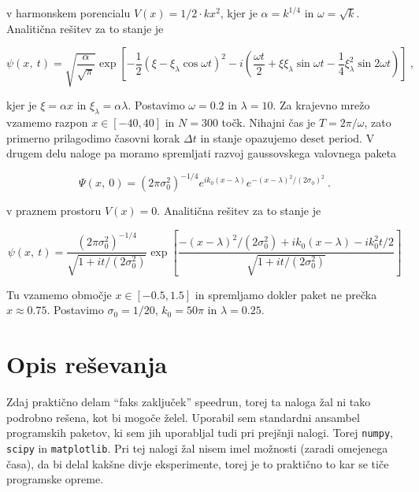 \documentclass[a4paper]{article}
\begin{document}
v harmonskem porencialu $V(x) = 1/2\cdot k x^2$, kjer je $\alpha = k^{1/4}$ in $\omega = \sqrt{k}$.
Analitična rešitev za to stanje je

\begin{equation}
    \psi(x,\>t) = \sqrt{\frac{\alpha}{\sqrt{\pi}}} \exp{\left[-\frac{1}{2}(\xi - 
    \xi_\lambda \cos{\omega t})^2-
    i\left(\frac{\omega t}{2} + \xi\xi_\lambda \sin{\omega t} - 
    \frac{1}{4}\xi_\lambda^2\sin{2\omega t}\right)\right]}\>,
    \label{analiticna_resitev1}
\end{equation}

kjer je $\xi=\alpha x$ in $\xi_\lambda = \alpha\lambda$. Postavimo $\omega=0.2$ in $\lambda=10$.
Za krajevno mrežo vzamemo razpon $x\in[-40, 40]$ in $N=300$ točk. Nihajni čas je $T=2\pi/\omega$,
zato primerno prilagodimo časovni korak $\Delta t$ in stanje opazujemo deset period. V drugem delu naloge pa moramo spremljati razvoj gaussovskega valovnega paketa 

\begin{equation}
    \Psi(x,\>0) = (2\pi\sigma_0^2)^{-1/4} e^{ik_0(x-\lambda)}e^{-(x-\lambda)^2/(2\sigma_0)^2}\>.
    \label{zacetno_stanje2}
\end{equation}

v praznem prostoru $V(x) = 0$. Analitična rešitev za to stanje je

\begin{equation}
    \psi(x,\>t) = \frac{(2\pi\sigma_0^2)^{-1/4}}{\sqrt{1 + i t/(2\sigma_0^2)}}
    \exp{\left[\frac{-(x-\lambda)^2/(2\sigma_0^2) + ik_0(x-\lambda)-ik_0^2 t/2}
    {\sqrt{1 + i t/(2\sigma_0^2)}}\right]}
    \label{analiticna_resitev2}
\end{equation}

Tu vzamemo območje $x\in[-0.5, 1.5]$ in spremljamo dokler paket ne prečka $x\approx 0.75$.
Postavimo $\sigma_0=1/20$, $k_0=50\pi$ in $\lambda=0.25$.

\section{Opis reševanja}
Zdaj praktično delam ``faks zaključek'' speedrun, torej ta naloga žal ni tako podrobno rešena,
kot bi mogoče želel. Uporabil sem standardni ansambel programskih paketov, ki sem jih uporabljal
tudi pri prejšnji nalogi. Torej \texttt{numpy}, \texttt{scipy} in \texttt{matplotlib}. Pri tej nalogi
žal nisem imel možnosti (zaradi omejenega časa), da bi delal kakšne divje eksperimente, torej je to praktično to
kar se tiče programske opreme.\\
\end{document}
